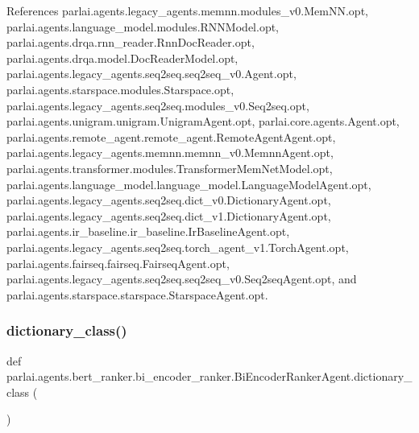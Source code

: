References parlai.\+agents.\+legacy\+\_\+agents.\+memnn.\+modules\+\_\+v0.\+Mem\+N\+N.\+opt, parlai.\+agents.\+language\+\_\+model.\+modules.\+R\+N\+N\+Model.\+opt, parlai.\+agents.\+drqa.\+rnn\+\_\+reader.\+Rnn\+Doc\+Reader.\+opt, parlai.\+agents.\+drqa.\+model.\+Doc\+Reader\+Model.\+opt, parlai.\+agents.\+legacy\+\_\+agents.\+seq2seq.\+seq2seq\+\_\+v0.\+Agent.\+opt, parlai.\+agents.\+starspace.\+modules.\+Starspace.\+opt, parlai.\+agents.\+legacy\+\_\+agents.\+seq2seq.\+modules\+\_\+v0.\+Seq2seq.\+opt, parlai.\+agents.\+unigram.\+unigram.\+Unigram\+Agent.\+opt, parlai.\+core.\+agents.\+Agent.\+opt, parlai.\+agents.\+remote\+\_\+agent.\+remote\+\_\+agent.\+Remote\+Agent\+Agent.\+opt, parlai.\+agents.\+legacy\+\_\+agents.\+memnn.\+memnn\+\_\+v0.\+Memnn\+Agent.\+opt, parlai.\+agents.\+transformer.\+modules.\+Transformer\+Mem\+Net\+Model.\+opt, parlai.\+agents.\+language\+\_\+model.\+language\+\_\+model.\+Language\+Model\+Agent.\+opt, parlai.\+agents.\+legacy\+\_\+agents.\+seq2seq.\+dict\+\_\+v0.\+Dictionary\+Agent.\+opt, parlai.\+agents.\+legacy\+\_\+agents.\+seq2seq.\+dict\+\_\+v1.\+Dictionary\+Agent.\+opt, parlai.\+agents.\+ir\+\_\+baseline.\+ir\+\_\+baseline.\+Ir\+Baseline\+Agent.\+opt, parlai.\+agents.\+legacy\+\_\+agents.\+seq2seq.\+torch\+\_\+agent\+\_\+v1.\+Torch\+Agent.\+opt, parlai.\+agents.\+fairseq.\+fairseq.\+Fairseq\+Agent.\+opt, parlai.\+agents.\+legacy\+\_\+agents.\+seq2seq.\+seq2seq\+\_\+v0.\+Seq2seq\+Agent.\+opt, and parlai.\+agents.\+starspace.\+starspace.\+Starspace\+Agent.\+opt.

\mbox{\label{classparlai_1_1agents_1_1bert__ranker_1_1bi__encoder__ranker_1_1BiEncoderRankerAgent_a7920edd41a6bdbd18e9a0c50a1953f9d}} 
\subsubsection{\texorpdfstring{dictionary\+\_\+class()}{dictionary\_class()}}
{\footnotesize\ttfamily def parlai.\+agents.\+bert\+\_\+ranker.\+bi\+\_\+encoder\+\_\+ranker.\+Bi\+Encoder\+Ranker\+Agent.\+dictionary\+\_\+class (\begin{DoxyParamCaption}{ }\end{DoxyParamCaption})\hspace{0.3cm}{\ttfamily [static]}}



